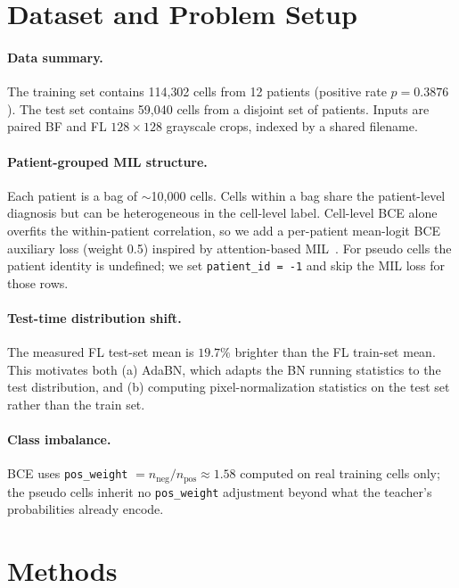 \documentclass[conference]{IEEEtran}
\begin{document}
\section{Dataset and Problem Setup}
\label{sec:data}

\paragraph{Data summary.} The training set contains 114{,}302 cells from 12 patients (positive rate $p = 0.3876$). The test set contains 59{,}040 cells from a disjoint set of patients. Inputs are paired BF and FL $128 \times 128$ grayscale crops, indexed by a shared filename.

\paragraph{Patient-grouped MIL structure.} Each patient is a bag of $\sim$10{,}000 cells. Cells within a bag share the patient-level diagnosis but can be heterogeneous in the cell-level label. Cell-level BCE alone overfits the within-patient correlation, so we add a per-patient mean-logit BCE auxiliary loss (weight 0.5) inspired by attention-based MIL~\cite{ilse2018attentionmil}. For pseudo cells the patient identity is undefined; we set \texttt{patient\_id = -1} and skip the MIL loss for those rows.

\paragraph{Test-time distribution shift.} The measured FL test-set mean is $19.7\%$ brighter than the FL train-set mean. This motivates both (a) AdaBN, which adapts the BN running statistics to the test distribution, and (b) computing pixel-normalization statistics on the test set rather than the train set.

\paragraph{Class imbalance.} BCE uses \texttt{pos\_weight} $= n_{\text{neg}} / n_{\text{pos}} \approx 1.58$ computed on real training cells only; the pseudo cells inherit no \texttt{pos\_weight} adjustment beyond what the teacher's probabilities already encode.

\section{Methods}
\label{sec:methods}
\end{document}
